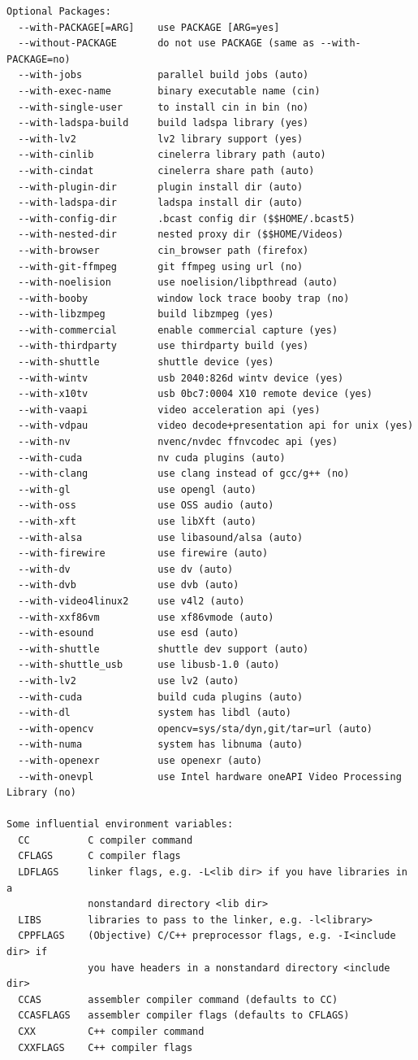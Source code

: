 \begin{verbatim}
Optional Packages:
  --with-PACKAGE[=ARG]    use PACKAGE [ARG=yes]
  --without-PACKAGE       do not use PACKAGE (same as --with-PACKAGE=no)
  --with-jobs             parallel build jobs (auto)
  --with-exec-name        binary executable name (cin)
  --with-single-user      to install cin in bin (no)
  --with-ladspa-build     build ladspa library (yes)
  --with-lv2              lv2 library support (yes)
  --with-cinlib           cinelerra library path (auto)
  --with-cindat           cinelerra share path (auto)
  --with-plugin-dir       plugin install dir (auto)
  --with-ladspa-dir       ladspa install dir (auto)
  --with-config-dir       .bcast config dir ($$HOME/.bcast5)
  --with-nested-dir       nested proxy dir ($$HOME/Videos)
  --with-browser          cin_browser path (firefox)
  --with-git-ffmpeg       git ffmpeg using url (no)
  --with-noelision        use noelision/libpthread (auto)
  --with-booby            window lock trace booby trap (no)
  --with-libzmpeg         build libzmpeg (yes)
  --with-commercial       enable commercial capture (yes)
  --with-thirdparty       use thirdparty build (yes)
  --with-shuttle          shuttle device (yes)
  --with-wintv            usb 2040:826d wintv device (yes)
  --with-x10tv            usb 0bc7:0004 X10 remote device (yes)
  --with-vaapi            video acceleration api (yes)
  --with-vdpau            video decode+presentation api for unix (yes)
  --with-nv               nvenc/nvdec ffnvcodec api (yes)
  --with-cuda             nv cuda plugins (auto)
  --with-clang            use clang instead of gcc/g++ (no)
  --with-gl               use opengl (auto)
  --with-oss              use OSS audio (auto)
  --with-xft              use libXft (auto)
  --with-alsa             use libasound/alsa (auto)
  --with-firewire         use firewire (auto)
  --with-dv               use dv (auto)
  --with-dvb              use dvb (auto)
  --with-video4linux2     use v4l2 (auto)
  --with-xxf86vm          use xf86vmode (auto)
  --with-esound           use esd (auto)
  --with-shuttle          shuttle dev support (auto)
  --with-shuttle_usb      use libusb-1.0 (auto)
  --with-lv2              use lv2 (auto)
  --with-cuda             build cuda plugins (auto)
  --with-dl               system has libdl (auto)
  --with-opencv           opencv=sys/sta/dyn,git/tar=url (auto)
  --with-numa             system has libnuma (auto)
  --with-openexr          use openexr (auto)
  --with-onevpl           use Intel hardware oneAPI Video Processing Library (no)

Some influential environment variables:
  CC          C compiler command
  CFLAGS      C compiler flags
  LDFLAGS     linker flags, e.g. -L<lib dir> if you have libraries in a
              nonstandard directory <lib dir>
  LIBS        libraries to pass to the linker, e.g. -l<library>
  CPPFLAGS    (Objective) C/C++ preprocessor flags, e.g. -I<include dir> if
              you have headers in a nonstandard directory <include dir>
  CCAS        assembler compiler command (defaults to CC)
  CCASFLAGS   assembler compiler flags (defaults to CFLAGS)
  CXX         C++ compiler command
  CXXFLAGS    C++ compiler flags


\end{verbatim}
